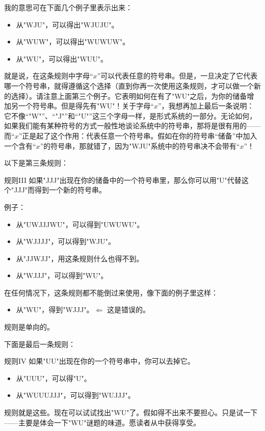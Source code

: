 我的意思可在下面几个例子里表示出来：
\begin{itemize}
\item 从"WJU"，可以得出"WJUJU"。
\item 从"WUW"，可以得出"WUWUW"。
\item 从"WU"，可以得出"WUU"。
\end{itemize}

就是说，在这条规则中字母“$x$”可以代表任意的符号串。但是，一旦决定了它代表哪一个符号串，就得遵循这个选择（直到你再一次使用这条规则，才可以做一个新的选择）。请注意上面第三个例子。它表明如何在有了"WU"之后，为你的储备增加另一个符号串。但是得先有"WU"！关于字母“$x$”，我想再加上最后一条说明：它不像“"W"”、“"J"”和“"U"”这三个字母一样，是形式系统的一部分。无论如何，如果我们能有某种符号的方式一般性地谈论系统中的符号串，那将是很有用的——而“$x$”正是起了这个作用：代表任意一个符号串。假如在你的符号串“储备”中加入一个含有“$x$”的符号串，那就错了，因为"WJU"系统中的符号串决不会带有“$x$”！

以下是第三条规则：
\begin{thm}{规则III}
如果"JJJ"出现在你的储备中的一个符号串里，那么你可以用"U"代替这个"JJJ"而得到一个新的符号串。
\end{thm}
例子：
\begin{itemize}
\item 从"UWJJJWU"，可以得到"UWUWU"。
\item 从"WJJJJ"，可以得到"WJU"。
\item 从"JJWJJ"，用这条规则什么也得不到。
\item 从"WJJJ"，可以得到"WU"。
\end{itemize}
在任何情况下，这条规则都不能倒过来使用，像下面的例子里这样：
\begin{itemize}
\item 从"WU"，得到"WJJJ"。\hfill $\Longleftarrow$ 这是错误的。
\end{itemize}
规则是单向的。

下面是最后一条规则：
\begin{thm}{规则IV}
如果"UU"出现在你的一个符号串中，你可以去掉它。
\end{thm}

\begin{itemize}
\item 从"UUU"，可以得"U"。
\item 从"WUUUJJJ"，可以得到"WUJJJ"。
\end{itemize}
规则就是这些。现在可以试试找出"WU"了。假如得不出来不要担心。只是试一下——主要是体会一下"WU"谜题的味道。愿读者从中获得享受。

